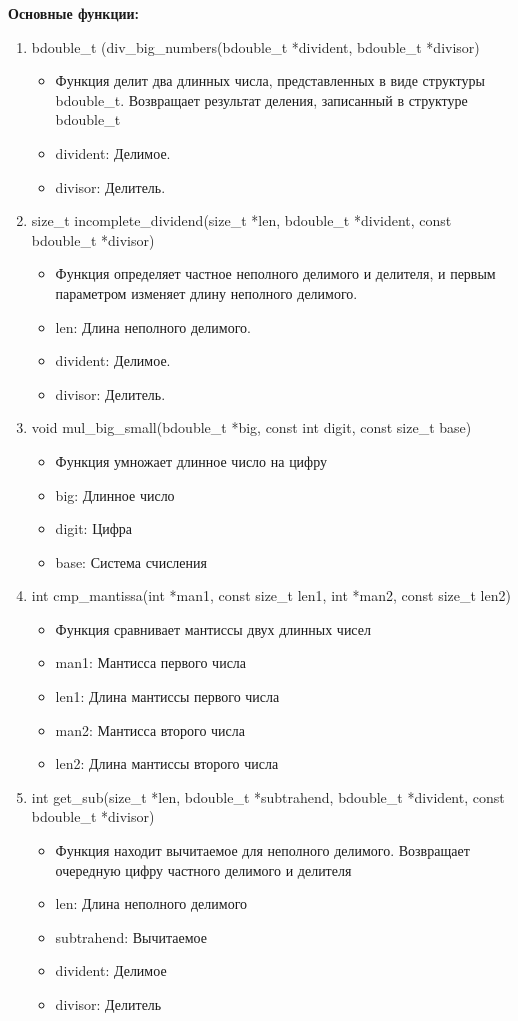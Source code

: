\textbf{Основные функции:}
\begin{enumerate}
	\item bdouble\_t (div\_big\_numbers(bdouble\_t *divident, bdouble\_t *divisor)
	\begin{itemize}
		\item Функция делит два длинных числа, представленных в виде структуры bdouble\_t. Возвращает результат деления, записанный в структуре bdouble\_t 
		\item divident: Делимое.
		\item divisor: Делитель.
	\end{itemize}
	
	\item size\_t incomplete\_dividend(size\_t *len, bdouble\_t *divident, const bdouble\_t *divisor)
	\begin{itemize}
		\item Функция определяет частное неполного делимого и делителя, и первым параметром изменяет длину неполного делимого.
		\item len: Длина неполного делимого.
		\item divident: Делимое.
		\item divisor: Делитель.
	\end{itemize}
	
	\item void mul\_big\_small(bdouble\_t *big, const int digit, const size\_t base)
	\begin{itemize}
		\item Функция умножает длинное число на цифру
		\item big: Длинное число
		\item digit: Цифра 
		\item base: Система счисления
	\end{itemize}
	
	\item int cmp\_mantissa(int *man1, const size\_t len1, int *man2, const size\_t len2)
	\begin{itemize}
		\item Функция сравнивает мантиссы двух длинных чисел
		\item man1: Мантисса первого числа
		\item len1: Длина мантиссы первого числа
		\item man2: Мантисса второго числа
		\item len2: Длина мантиссы второго числа
	\end{itemize}
	
	\item  int get\_sub(size\_t *len, bdouble\_t *subtrahend, bdouble\_t *divident, const bdouble\_t *divisor)
	\begin{itemize}
		\item Функция находит вычитаемое для неполного делимого. Возвращает очередную цифру частного делимого и делителя
		\item len: Длина неполного делимого
		\item subtrahend: Вычитаемое
		\item divident: Делимое
		\item divisor: Делитель
	\end{itemize}
\end{enumerate}
